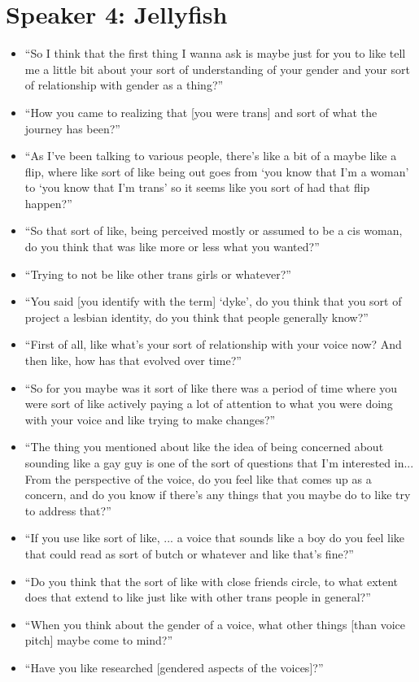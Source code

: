 \documentclass[12pt,twoside]{reedthesis}
\begin{document}
\section{Speaker 4: Jellyfish}
\begin{itemize}
 \item ``So I think that the first thing I wanna ask is maybe just for you to like tell me a little bit about your sort of understanding of your gender and your sort of relationship with gender as a thing?''
 \item ``How you came to realizing that [you were trans] and sort of what the journey has been?''
 \item ``As I've been talking to various people, there's like a bit of a maybe like a flip, where like sort of like being out goes from `you know that I'm a woman' to `you know that I'm trans' so it seems like you sort of had that flip happen?''
 \item ``So that sort of like, being perceived mostly or assumed to be a cis woman, do you think that was like more or less what you wanted?''
 \item ``Trying to not be like other trans girls or whatever?''
 \item ``You said [you identify with the term] `dyke', do you think that you sort of project a lesbian identity, do you think that people generally know?''
 \item ``First of all, like what's your sort of relationship with your voice now? And then like, how has that evolved over time?''
 \item ``So for you maybe was it sort of like there was a period of time where you were sort of like actively paying a lot of attention to what you were doing with your voice and like trying to make changes?''
 \item ``The thing you mentioned about like the idea of being concerned about sounding like a gay guy is one of the sort of questions that I'm interested in... From the perspective of the voice, do you feel like that comes up as a concern, and do you know if there's any things that you maybe do to like try to address that?''
 \item ``If you use like sort of like, ... a voice that sounds like a boy do you feel like that could read as sort of butch or whatever and like that's fine?''
 \item ``Do you think that the sort of like with close friends circle, to what extent does that extend to like just like with other trans people in general?''
 \item ``When you think about the gender of a voice, what other things [than voice pitch] maybe come to mind?''
 \item ``Have you like researched [gendered aspects of the voices]?''
\end{itemize}
\end{document}
